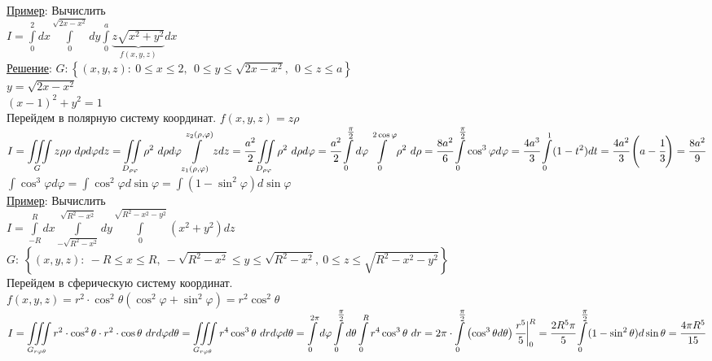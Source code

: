 \underline{Пример}: Вычислить \\
$\displaystyle   I = \int\limits_{0}^{2} dx \int\limits_{0}^{\sqrt{2x - x^2}} dy \int\limits_{0}^{a} \underbrace{z \sqrt{x^2 + y^2}}_{f(x,y,z)} dx$ \\
\underline{Решение}:
$G: \left\{(x,y,z): \ 0 \leqslant x \leqslant 2, \ \ 0 \leqslant y \leqslant \sqrt{2x - x^2}, \ \ 0 \leqslant z \leqslant a \right\}$ \\
$y = \sqrt{2x - x^2}$ \\
$(x-1)^2 + y^2 = 1$ \\
Перейдем в полярную систему координат.
$f(x,y,z) = z\rho$ \\
$\displaystyle   I = \iiint\limits_{G} z \rho \rho \ d\rho d\varphi dz = 
\iint\limits_{D_{\rho \varphi}} \rho^2 \ d\rho d\varphi \int\limits_{z_1(\rho, \varphi)}^{z_2(\rho, \varphi)} z dz = 
\cfrac{a^2}{2} \iint\limits_{D_{\rho \varphi}} \rho^2 \ d\rho d\varphi = 
\cfrac{a^2}{2} \int\limits_{0}^{\tfrac{\pi}{2}} d\varphi \int\limits_{0}^{2\cos{\varphi}} \rho^2 \ d\rho = 
\cfrac{8 a^2}{6} \int\limits_{0}^{\tfrac{\pi}{2}} \cos^3{\varphi} d\varphi = 
\cfrac{4 a^3}{3} \int\limits_{0}^{1} (1 - t^2) dt = 
\cfrac{4a^2}{3} \left(a - \cfrac{1}{3} \right) = \cfrac{8a^2}{9}$ \\
$\displaystyle  \int \cos^3{\varphi} d\varphi = \int \cos^2{\varphi} d\sin{\varphi} = \int (1 - \sin^2{\varphi}) d\sin{\varphi}$ \\


\underline{Пример}: Вычислить \\
$\displaystyle  I = \int\limits_{-R}^{R} dx \int\limits_{-\sqrt{R^2 - x^2}}^{\sqrt{R^2 - x^2}} dy \int\limits_{0}^{\sqrt{R^2 - x^2 - y^2}} (x^2 + y^2) dz$ \\
$G: \ \left\{(x,y,z): \ -R \leqslant x \leqslant R, \ -\sqrt{R^2 - x^2} \leqslant y \leqslant \sqrt{R^2 - x^2}, \ 0 \leqslant z \leqslant \sqrt{R^2 - x^2 - y^2} \right\}$ \\
Перейдем в сферическую систему координат. \\
$f(x,y,z) = r^2 \cdot \cos^2{\theta} (\cos^2{\varphi} + \sin^2{\varphi}) = r^2 \cos^2{\theta}$ \\
$\displaystyle  I = \iiint\limits_{G_{r \varphi \theta}} r^2 \cdot \cos^2{\theta} \cdot r^2 \cdot \cos{\theta} \ dr d\varphi d\theta = 
\iiint\limits_{G_{r \varphi \theta}} r^4 \cos^3{\theta} \ dr d\varphi d\theta = 
\int\limits_{0}^{2\pi} d\varphi \int\limits_{0}^{\tfrac{\pi}{2}} d\theta \int\limits_{0}^{R} r^4 \cos^3{\theta} \ dr = 
2\pi \cdot \int\limits_{0}^{\tfrac{\pi}{2}} \left( \cos^3{\theta} d\theta\right) \cfrac{r^5}{5} \bigg|_{0}^{R} = 
\cfrac{2R^5 \pi}{5} \int\limits_{0}^{\tfrac{\pi}{2}} (1 - \sin^2{\theta}) d\sin{\theta} = 
\cfrac{4 \pi R^5}{15}$ \\






















